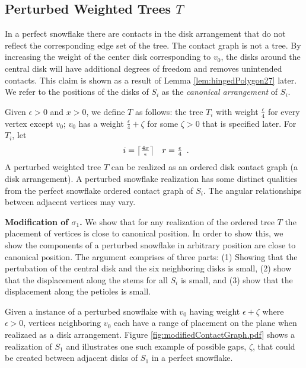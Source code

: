 \subsection{Perturbed Weighted Trees $T$}
In a perfect snowflake there are contacts in the disk arrangement that do not reflect the corresponding edge set of the tree.  
The contact graph is not a tree.
By increasing the weight of the center disk corresponding to $v_0$, the disks around the central disk will have additional degrees of freedom and removes unintended contacts.    
This claim is shown as a result of Lemma \ref{lem:hingedPolygon27} later.
We refer to the positions of the disks of $S_i$ as the \textit{canonical arrangement} of $S_i$.

Given $\epsilon > 0$ and $x >0$, we define $T$ as follows: the tree $T_i$ with weight $\frac{\epsilon}{4}$ for every vertex except $v_0$; $v_0$ has a weight $\frac{\epsilon}{4} + \zeta$ for some $\zeta>0$ that is specified later.  For $T_i$, let 
$$\begin{array}{cc}
i = \left\lceil \frac{4x}{\epsilon} \right\rceil&r = \frac{\epsilon}{4}
\end{array} .$$ 
A perturbed weighted tree $T$ can be realized as an ordered disk contact graph (a disk arrangement).  
A perturbed snowflake realization has some distinct qualities from the perfect snowflake ordered contact graph of $S_i$.    
The angular relationships between adjacent vertices may vary.

\textbf{Modification of $\sigma_1$.}
We show that for any realization of the ordered tree $T$
 the placement of vertices is close to canonical position.  
In order to show this, we show the components of a perturbed snowflake in arbitrary position  are close to canonical position.  
The argument comprises of three parts: (1) Showing that the pertubation of the central disk and the six neighboring disks is small, (2) show that the displacement along the stems for all $S_i$ is small, and (3) show that the displacement along the petioles is small.  

Given a instance of a perturbed snowflake with $v_0$ having weight $\epsilon + \zeta$ where $\epsilon > 0$, vertices neighboring $v_0$ each have a range of placement on the plane when realizaed as a disk arrangement. 
Figure \ref{fig:modifiedContactGraph.pdf} shows a realization of $S_1$ and illustrates one such example of possible gaps, $\zeta$, that could be created between adjacent disks of $S_1$ in a perfect snowflake.



  
 